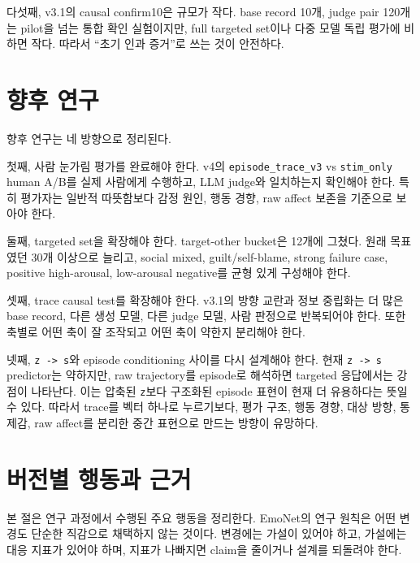 \documentclass[11pt,a4paper]{article}
\newcommand{\eng}[1]{\texttt{#1}}
\begin{document}
다섯째, v3.1의 causal confirm10은 규모가 작다. base record 10개, judge pair 120개는 pilot을 넘는 통합 확인 실험이지만, full targeted set이나 다중 모델 독립 평가에 비하면 작다. 따라서 ``초기 인과 증거''로 쓰는 것이 안전하다.

\section{향후 연구}

향후 연구는 네 방향으로 정리된다.

첫째, 사람 눈가림 평가를 완료해야 한다. v4의 \eng{episode\_trace\_v3} vs \eng{stim\_only} human A/B를 실제 사람에게 수행하고, LLM judge와 일치하는지 확인해야 한다. 특히 평가자는 일반적 따뜻함보다 감정 원인, 행동 경향, raw affect 보존을 기준으로 보아야 한다.

둘째, targeted set을 확장해야 한다. target-other bucket은 12개에 그쳤다. 원래 목표였던 30개 이상으로 늘리고, social mixed, guilt/self-blame, strong failure case, positive high-arousal, low-arousal negative를 균형 있게 구성해야 한다.

셋째, trace causal test를 확장해야 한다. v3.1의 방향 교란과 정보 중립화는 더 많은 base record, 다른 생성 모델, 다른 judge 모델, 사람 판정으로 반복되어야 한다. 또한 축별로 어떤 축이 잘 조작되고 어떤 축이 약한지 분리해야 한다.

넷째, \eng{z -> s}와 episode conditioning 사이를 다시 설계해야 한다. 현재 \eng{z -> s} predictor는 약하지만, raw trajectory를 episode로 해석하면 targeted 응답에서는 강점이 나타난다. 이는 압축된 \eng{z}보다 구조화된 episode 표현이 현재 더 유용하다는 뜻일 수 있다. 따라서 trace를 벡터 하나로 누르기보다, 평가 구조, 행동 경향, 대상 방향, 통제감, raw affect를 분리한 중간 표현으로 만드는 방향이 유망하다.

\section{버전별 행동과 근거}

본 절은 연구 과정에서 수행된 주요 행동을 정리한다. EmoNet의 연구 원칙은 어떤 변경도 단순한 직감으로 채택하지 않는 것이다. 변경에는 가설이 있어야 하고, 가설에는 대응 지표가 있어야 하며, 지표가 나빠지면 claim을 줄이거나 설계를 되돌려야 한다.
\end{document}
